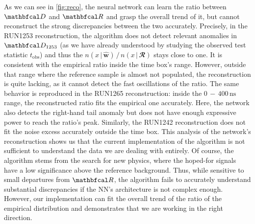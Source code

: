 As we can see in \autoref{fig:reco}, the neural network can learn the ratio between $\D$ and $\R$ and grasp the overall
trend of it, but cannot reconstruct the strong discrepancies between the two accurately. Precisely, in the RUN1253
reconstruction, the algorithm does not detect relevant anomalies in $\D_{1253}$ (as we have already understood by
studying the observed test statistic $t_{\text{obs}}$) and thus the $n(x\,|\,\widehat{\mathbf{w}}) \, / \,
n(x\,|\,\mathbfcal{R})$ stays close to one. It is consistent with the empirical ratio inside the time box's range.
However, outside that range where the reference sample is almost not populated, the reconstruction is quite lacking, as
it cannot detect the fast oscillations of the ratio. The same behavior is reproduced in the RUN1265 reconstruction:
inside the $0\,-\,400\,\si{\nano\second}$ range, the reconstructed ratio fits the empirical one accurately. Here, the
network also detects the right-hand tail anomaly but does not have enough expressive power to reach the ratio's peak.
Similarly, the RUN1242 reconstruction does not fit the noise excess accurately outside the time box. This analysis of
the network's reconstruction shows us that the current implementation of the algorithm is not sufficient to understand
the data we are dealing with entirely. Of course, the algorithm stems from the search for new physics, where the
hoped-for signals have a low significance above the reference background. Thus, while sensitive to small departures from
$\R$, the algorithm fails to accurately understand substantial discrepancies if the NN's architecture is not complex
enough. However, our implementation can fit the overall trend of the ratio of the empirical distribution and
demonstrates that we are working in the right direction.

















